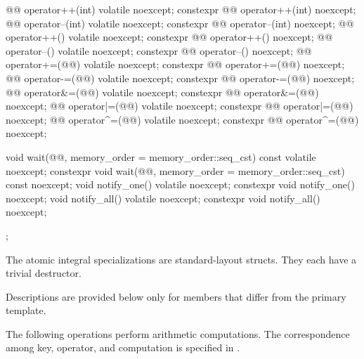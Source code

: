 \begin{codeblock}
{{    @@ operator++(int) volatile noexcept;
    constexpr @@ operator++(int) noexcept;
    @@ operator--(int) volatile noexcept;
    constexpr @@ operator--(int) noexcept;
    @@ operator++() volatile noexcept;
    constexpr @@ operator++() noexcept;
    @@ operator--() volatile noexcept;
    constexpr @@ operator--() noexcept;
    @@ operator+=(@@) volatile noexcept;
    constexpr @@ operator+=(@@) noexcept;
    @@ operator-=(@@) volatile noexcept;
    constexpr @@ operator-=(@@) noexcept;
    @@ operator&=(@@) volatile noexcept;
    constexpr @@ operator&=(@@) noexcept;
    @@ operator|=(@@) volatile noexcept;
    constexpr @@ operator|=(@@) noexcept;
    @@ operator^=(@@) volatile noexcept;
    constexpr @@ operator^=(@@) noexcept;

    void wait(@@, memory_order = memory_order::seq_cst) const volatile noexcept;
    constexpr void wait(@@, memory_order = memory_order::seq_cst) const noexcept;
    void notify_one() volatile noexcept;
    constexpr void notify_one() noexcept;
    void notify_all() volatile noexcept;
    constexpr void notify_all() noexcept;
  };
}
\end{codeblock}

\pnum
The atomic integral specializations
are standard-layout structs.
They each have
a trivial destructor.

\pnum
Descriptions are provided below only for members that differ from the primary template.

\pnum
The following operations perform arithmetic computations.
The correspondence among key, operator, and computation is specified
in .

